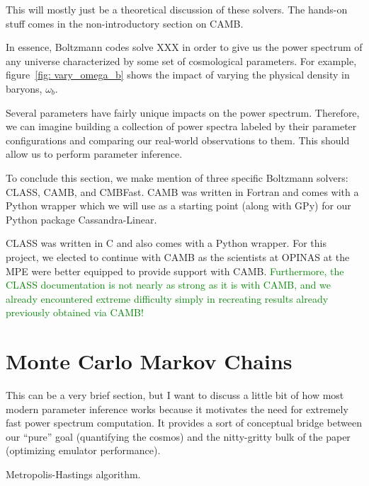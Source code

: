 
This will mostly just be a theoretical discussion of these solvers. The hands-on stuff comes in the non-introductory section on CAMB.


In essence, Boltzmann codes solve XXX in order to give us the power spectrum
of any universe characterized by some set of cosmological parameters. For
example, figure~\ref{fig: vary_omega_b} shows the impact of varying the
physical density in baryons, $\omega_b$. 

Several parameters have fairly unique impacts on the power spectrum.
Therefore, we can imagine building a collection of power spectra labeled by
their parameter configurations and comparing our real-world observations to
them. This should allow us to perform parameter inference.

To conclude this section, we make mention of three specific Boltzmann solvers: 
CLASS, CAMB, and CMBFast.
CAMB was written in Fortran and comes with a Python wrapper which we
will use as a starting point (along with GPy) for our Python package
Cassandra-Linear.

CLASS was written in C and also comes with a Python wrapper.
For this project, we elected to continue with CAMB as the scientists at
OPINAS at the MPE were better equipped to provide support with CAMB.
\textcolor{green}{Furthermore, the CLASS documentation
is not nearly as strong as it is with CAMB, and we already encountered
extreme difficulty simply in recreating results already previously obtained
via CAMB!}

\section{Monte Carlo Markov Chains}

This can be a very brief section, but I want to discuss a little bit of how most modern parameter inference works because it motivates the need for extremely fast power spectrum computation. It provides a sort of conceptual bridge between our ``pure'' goal (quantifying the cosmos) and the nitty-gritty bulk of the paper (optimizing emulator performance).

Metropolis-Hastings algorithm.

